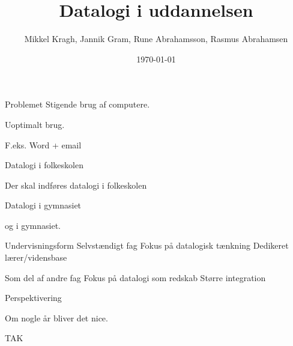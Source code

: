 \documentclass{beamer}
\title[Datalogi i uddannelsen]{Datalogi i uddannelsen}
\author{Mikkel Kragh, Jannik Gram, Rune Abrahamsson, Rasmus Abrahamsen}
\institute{DIKU}
\date{\today}
\begin{document}
\begin{frame}
\titlepage
\end{frame}


\begin{frame}{Problemet}
Stigende brug af computere.

Uoptimalt brug.

F.eks.
Word + email

\end{frame}

\begin{frame}{Datalogi i folkeskolen}

Der skal indføres datalogi i folkeskolen

\end{frame}

\begin{frame}{Datalogi i gymnasiet}

og i gymnasiet.

\end{frame}

\begin{frame}{Undervisningsform}
Selvstændigt fag
Fokus på datalogisk tænkning
Dedikeret lærer/vidensbase

Som del af andre fag
Fokus på datalogi som redskab
Større integration

\end{frame}

\begin{frame}{Perspektivering}

Om nogle år bliver det nice.

\end{frame}

\begin{frame}{TAK}

\end{frame}
\end{document}
